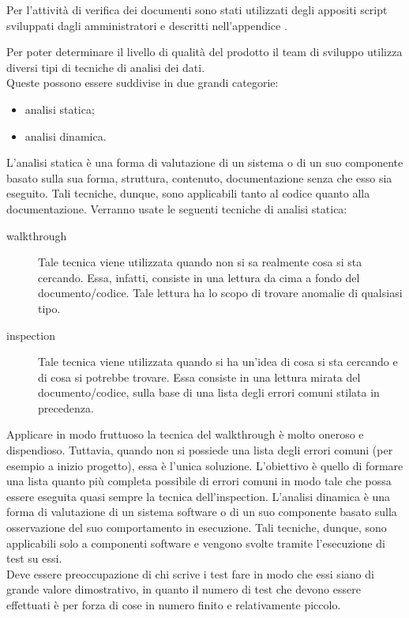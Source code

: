 	
	Per l'attività di verifica dei documenti sono stati utilizzati degli appositi script sviluppati dagli amministratori e descritti nell'appendice .

			Per poter determinare il livello di qualità del prodotto il team di sviluppo utilizza diversi tipi di tecniche di analisi dei dati.\\
			Queste possono essere suddivise in due grandi categorie:
			\begin{itemize}
				\item analisi statica;
				\item analisi dinamica.
			\end{itemize}
				L'analisi statica è una forma di valutazione di un sistema o di un suo componente basato sulla sua forma, struttura, contenuto, documentazione senza che esso sia eseguito. Tali tecniche, dunque, sono applicabili tanto al codice quanto alla documentazione.
				Verranno usate le seguenti tecniche di analisi statica:
				\begin{description}
					\item[walkthrough] Tale tecnica viene utilizzata quando non si sa realmente cosa si sta cercando. Essa, infatti, consiste in una lettura da cima a fondo del documento/codice. Tale lettura ha lo scopo di trovare anomalie di qualsiasi tipo.
					\item[inspection] Tale tecnica viene utilizzata quando si ha un'idea di cosa si sta cercando e di cosa si potrebbe trovare. Essa consiste in una lettura mirata del documento/codice, sulla base di una lista degli errori comuni stilata in precedenza.
				\end{description}
				Applicare in modo fruttuoso la tecnica del walkthrough è molto oneroso e dispendioso. Tuttavia, quando non si possiede una lista degli	errori comuni (per esempio a inizio progetto), essa è l'unica soluzione. L'obiettivo è quello di formare una lista quanto più completa possibile di errori comuni in modo tale che possa essere eseguita quasi sempre la tecnica dell'inspection.
				L'analisi dinamica è una forma di valutazione di un sistema software o di un suo componente basato sulla osservazione del suo comportamento in esecuzione. Tali tecniche, dunque, sono applicabili solo a componenti software e vengono svolte tramite l'esecuzione di test su essi.\\
				Deve essere preoccupazione di chi scrive i test fare in modo che essi siano di grande valore dimostrativo, in quanto il numero di test che devono essere effettuati è per forza di cose in numero finito e relativamente piccolo.
		
